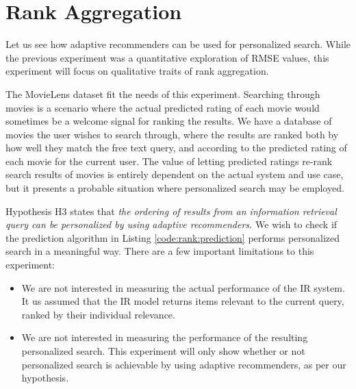 \section{Rank Aggregation}


\afterpage{\clearpage}

Let us see how adaptive recommenders can be used for personalized search.
While the previous experiment was a quantitative exploration of RMSE values,
this experiment will focus on qualitative traits of rank aggregation.

The MovieLens dataset fit the needs of this experiment.
Searching through movies is a scenario where the actual predicted
rating of each movie would sometimes be a welcome signal for ranking the results.
We have a database of movies the user wishes to search through,
where the results are ranked both by how well they match the free text query,
and according to the predicted rating of each movie for the current user.
The value of letting predicted ratings re-rank search results of movies
is entirely dependent on the actual system and use case,
but it presents a probable situation where personalized search may be employed.

Hypothesis H3 states that 
{
  \itshape
  the ordering of results from an information retrieval query
  can be personalized by using adaptive recommenders.
}
We wish to check if the prediction algorithm
in Listing \ref{code:rank:prediction} performs personalized search
in a meaningful way.
There are a few important limitations to this experiment:

\begin{itemize}
  \item 
    We are not interested in measuring the actual performance of the IR system.
    It us assumed that the IR model returns items relevant to the current query,
    ranked by their individual relevance.
  \item
    We are not interested in measuring the performance of the resulting personalized search.
    This experiment will only show whether or not personalized search is achievable
    by using adaptive recommenders, as per our hypothesis.
\end{itemize}

